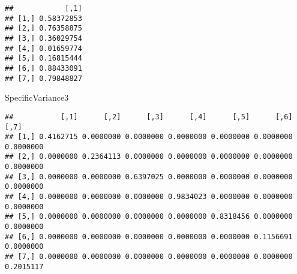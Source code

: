 \documentclass[
]{article}
\newenvironment{Shaded}{\begin{snugshade}}{\end{snugshade}}
\newcommand{\AttributeTok}[1]{\textcolor[rgb]{0.77,0.63,0.00}{#1}}
\newcommand{\CommentTok}[1]{\textcolor[rgb]{0.56,0.35,0.01}{\textit{#1}}}
\newcommand{\ControlFlowTok}[1]{\textcolor[rgb]{0.13,0.29,0.53}{\textbf{#1}}}
\newcommand{\DecValTok}[1]{\textcolor[rgb]{0.00,0.00,0.81}{#1}}
\newcommand{\FunctionTok}[1]{\textcolor[rgb]{0.00,0.00,0.00}{#1}}
\newcommand{\NormalTok}[1]{#1}
\newcommand{\OtherTok}[1]{\textcolor[rgb]{0.56,0.35,0.01}{#1}}
\newcommand{\SpecialCharTok}[1]{\textcolor[rgb]{0.00,0.00,0.00}{#1}}
\begin{document}
\begin{Shaded}
\end{Shaded}

\begin{verbatim}
##            [,1]
## [1,] 0.58372853
## [2,] 0.76358875
## [3,] 0.36029754
## [4,] 0.01659774
## [5,] 0.16815444
## [6,] 0.88433091
## [7,] 0.79848827
\end{verbatim}

\begin{Shaded}
\begin{Highlighting}[]
\NormalTok{SpecificVariance3}
\end{Highlighting}
\end{Shaded}

\begin{verbatim}
##           [,1]      [,2]      [,3]      [,4]      [,5]      [,6]      [,7]
## [1,] 0.4162715 0.0000000 0.0000000 0.0000000 0.0000000 0.0000000 0.0000000
## [2,] 0.0000000 0.2364113 0.0000000 0.0000000 0.0000000 0.0000000 0.0000000
## [3,] 0.0000000 0.0000000 0.6397025 0.0000000 0.0000000 0.0000000 0.0000000
## [4,] 0.0000000 0.0000000 0.0000000 0.9834023 0.0000000 0.0000000 0.0000000
## [5,] 0.0000000 0.0000000 0.0000000 0.0000000 0.8318456 0.0000000 0.0000000
## [6,] 0.0000000 0.0000000 0.0000000 0.0000000 0.0000000 0.1156691 0.0000000
## [7,] 0.0000000 0.0000000 0.0000000 0.0000000 0.0000000 0.0000000 0.2015117
\end{verbatim}
\end{document}
